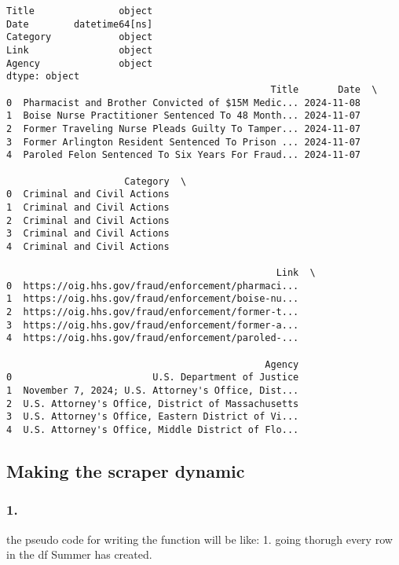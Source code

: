 \documentclass[
  letterpaper,
  DIV=11,
  numbers=noendperiod]{scrartcl}
\begin{document}
\begin{verbatim}
Title               object
Date        datetime64[ns]
Category            object
Link                object
Agency              object
dtype: object
                                               Title       Date  \
0  Pharmacist and Brother Convicted of $15M Medic... 2024-11-08   
1  Boise Nurse Practitioner Sentenced To 48 Month... 2024-11-07   
2  Former Traveling Nurse Pleads Guilty To Tamper... 2024-11-07   
3  Former Arlington Resident Sentenced To Prison ... 2024-11-07   
4  Paroled Felon Sentenced To Six Years For Fraud... 2024-11-07   

                     Category  \
0  Criminal and Civil Actions   
1  Criminal and Civil Actions   
2  Criminal and Civil Actions   
3  Criminal and Civil Actions   
4  Criminal and Civil Actions   

                                                Link  \
0  https://oig.hhs.gov/fraud/enforcement/pharmaci...   
1  https://oig.hhs.gov/fraud/enforcement/boise-nu...   
2  https://oig.hhs.gov/fraud/enforcement/former-t...   
3  https://oig.hhs.gov/fraud/enforcement/former-a...   
4  https://oig.hhs.gov/fraud/enforcement/paroled-...   

                                              Agency  
0                         U.S. Department of Justice  
1  November 7, 2024; U.S. Attorney's Office, Dist...  
2  U.S. Attorney's Office, District of Massachusetts  
3  U.S. Attorney's Office, Eastern District of Vi...  
4  U.S. Attorney's Office, Middle District of Flo...  
\end{verbatim}

\subsection{Making the scraper
dynamic}\label{making-the-scraper-dynamic}

\subsubsection{1.}\label{section-2}

the pseudo code for writing the function will be like: 1. going thorugh
every row in the df Summer has created.
\end{document}
